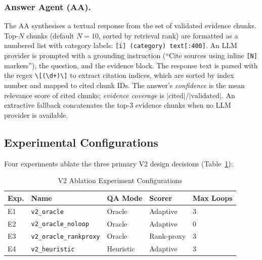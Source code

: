 \documentclass[11pt, a4paper]{article}
\begin{document}
\subsubsection*{Answer Agent (AA).}

The AA synthesises a textual response from the set of validated evidence chunks. Top-$N$ chunks (default $N{=}10$, sorted by retrieval rank) are formatted as a numbered list with category labels: \texttt{[i] (category) text[:400]}. An LLM provider is prompted with a grounding instruction (``Cite sources using inline \texttt{[N]} markers''), the question, and the evidence block. The response text is parsed with the regex \texttt{\textbackslash[(\textbackslash d+)\textbackslash]} to extract citation indices, which are sorted by index number and mapped to cited chunk IDs. The answer's \emph{confidence} is the mean relevance score of cited chunks; \emph{evidence coverage} is $|\text{cited}| / |\text{validated}|$. An extractive fallback concatenates the top-3 evidence chunks when no LLM provider is available.

\subsection{Experimental Configurations}

Four experiments ablate the three primary V2 design decisions (Table~\ref{tab:experiments}):

\begin{table}[htbp]
\centering
\caption{V2 Ablation Experiment Configurations}
\label{tab:experiments}
\begin{tabular}{lllll}
\toprule
\textbf{Exp.} & \textbf{Name} & \textbf{QA Mode} & \textbf{Scorer} & \textbf{Max Loops} \\
\midrule
E1 & \texttt{v2\_oracle}            & Oracle    & Adaptive    & 3 \\
E2 & \texttt{v2\_oracle\_noloop}    & Oracle    & Adaptive    & 0 \\
E3 & \texttt{v2\_oracle\_rankproxy} & Oracle    & Rank-proxy  & 3 \\
E4 & \texttt{v2\_heuristic}         & Heuristic & Adaptive    & 3 \\
\bottomrule
\end{tabular}
\end{table}
\end{document}
